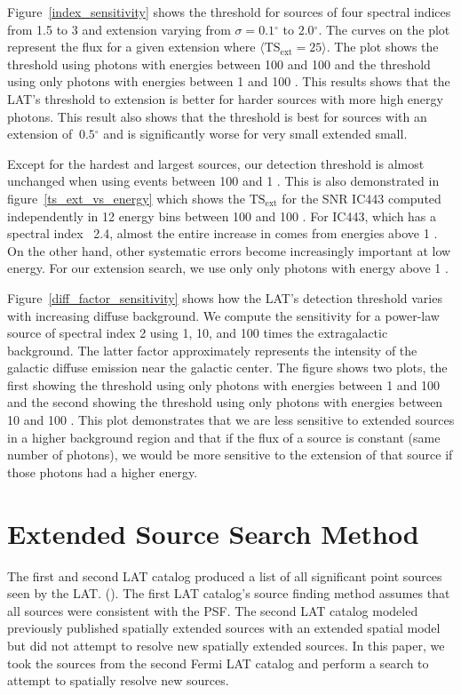 \documentclass[12pt,preprint]{aastex}
\newcommand{\mev}{\text{MeV}\xspace}
\newcommand{\gev}{\text{GeV}\xspace}
\newcommand{\tsext}{{\ensuremath{\text{TS}_\text{ext}}}\xspace}
\newcommand{\ts}{\text{TS}\xspace}
\renewcommand{\deg}{\ensuremath{^\circ}\xspace}
\begin{document}
Figure~\ref{index_sensitivity} shows the threshold for sources of four
spectral indices from 1.5 to 3 and extension varying from $\sigma=0.1\deg$
to $2.0\deg$.  The curves on the plot represent the flux for a given
extension where $\langle\tsext=25\rangle$.  The plot shows the threshold
using photons with energies between 100 \mev and 100 \gev and the
threshold using only photons with energies between 1 \gev and 100 \gev.
This results shows that the LAT's threshold to extension is better for
harder sources with more high energy photons. This result also shows
that the threshold is best for sources with an extension of $~0.5\deg$
and is significantly worse for very small extended small.

Except for the hardest and largest sources, our detection threshold
is almost unchanged when using events between 100 \mev and 1 \gev.
This is also demonstrated in figure~\ref{ts_ext_vs_energy} which shows
the \tsext for the SNR IC443 computed independently in 12 energy bins between 100 \mev and
100 \gev. For IC443, which has a spectral index ~2.4, almost the entire
increase in \ts comes from energies above 1 \gev.  On the other hand,
other systematic errors become increasingly important at low energy. For
our extension search, we use only only photons with energy above 1 \gev.

Figure~\ref{diff_factor_sensitivity} shows how the LAT's detection
threshold varies with increasing diffuse background. We compute the
sensitivity for a power-law source of spectral index 2 using 1, 10, and
100 times the extragalactic background. The latter factor approximately
represents the intensity of the galactic diffuse emission near the
galactic center.  The figure shows two plots, the first showing the
threshold using only photons with energies between 1 \gev and 100 \gev and
the second showing the threshold using only photons with energies between
10 \gev and 100 \gev. This plot demonstrates that we are less sensitive
to extended sources in a higher background region and that if the flux of
a source is constant (same number of photons), we would be more sensitive
to the extension of that source if those photons had a higher energy.

\section{Extended Source Search Method}


The first and second LAT catalog produced a list of all significant point
sources seen by the LAT.  (\cite{first_cat,second_cat}).  The first LAT
catalog's source finding method assumes that all sources were consistent
with the PSF. The second LAT catalog modeled previously published
spatially extended sources with an extended spatial model but did not
attempt to resolve new spatially extended sources. In this paper,
we took the sources from the second Fermi LAT catalog and perform
a search to attempt to spatially resolve new sources.
\end{document}
